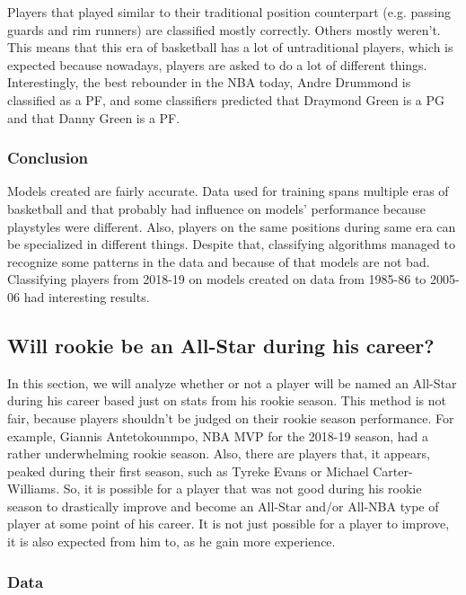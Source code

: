 \documentclass[a4paper]{article}
\begin{document}
Players that played similar to their traditional position counterpart (e.g. passing guards and rim runners) are classified mostly correctly. Others mostly weren't. This means that this era of basketball has a lot of untraditional players, which is expected because nowadays, players are asked to do a lot of different things. Interestingly, the best rebounder in the NBA today, Andre Drummond is classified as a PF, and some classifiers predicted that Draymond Green is a PG and that Danny Green is a PF. 

\subsubsection{Conclusion}
\label{subsubsec:pos_clf_conclusion}

Models created are fairly accurate. Data used for training spans multiple eras of basketball and that probably had influence on models' performance because playstyles were different. Also, players on the same positions during same era can be specialized in different things. Despite that, classifying algorithms managed to recognize some patterns in the data and because of that models are not bad. Classifying players from 2018-19 on models created on data from 1985-86 to 2005-06 had interesting results. 

\subsection{Will rookie be an All-Star during his career?}
\label{subsec:rookie_to_all_star}

In this section, we will analyze whether or not a player will be named an All-Star during his career based just on stats from his rookie season. This method is not fair, because players shouldn't be judged on their rookie season performance. For example, Giannis Antetokounmpo, NBA MVP for the 2018-19 season, had a rather underwhelming rookie season. Also, there are players that, it appears, peaked during their first season, such as Tyreke Evans or Michael Carter-Williams. So, it is possible for a player that was not good during his rookie season to drastically improve and become an All-Star and/or All-NBA type of player at some point of his career. It is not just possible for a player to improve, it is also expected from him to, as he gain more experience.

\subsubsection{Data}
\label{subsubsec:data_all_star}
\end{document}
